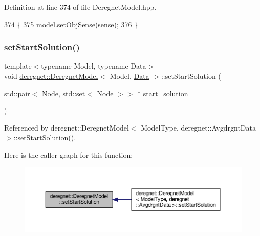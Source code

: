 Definition at line 374 of file Deregnet\+Model.\+hpp.


\begin{DoxyCode}
374                                                                     \{
375     \hyperlink{classderegnet_1_1DeregnetModel_a30d525de2086e342b33fe3e45ede4947}{model}.setObjSense(sense);
376 \}
\end{DoxyCode}
\mbox{\label{classderegnet_1_1DeregnetModel_a7a76da5bb39123d94c57ba2c940cb1c2}} 
\subsubsection{\texorpdfstring{set\+Start\+Solution()}{setStartSolution()}\hspace{0.1cm}{\footnotesize\ttfamily [1/3]}}
{\footnotesize\ttfamily template$<$typename Model, typename Data$>$ \\
void \hyperlink{classderegnet_1_1DeregnetModel}{deregnet\+::\+Deregnet\+Model}$<$ Model, \hyperlink{avgdrgnt_8cpp_a1d1235306db276e9b36acba1db1509e8}{Data} $>$\+::set\+Start\+Solution (\begin{DoxyParamCaption}\item[{std\+::pair$<$ \hyperlink{namespacederegnet_a744bad34f2de9856d36715a445f027f3}{Node}, std\+::set$<$ \hyperlink{namespacederegnet_a744bad34f2de9856d36715a445f027f3}{Node} $>$$>$ $\ast$}]{start\+\_\+solution }\end{DoxyParamCaption})\hspace{0.3cm}{\ttfamily [private]}}



Referenced by deregnet\+::\+Deregnet\+Model$<$ Model\+Type, deregnet\+::\+Avgdrgnt\+Data $>$\+::set\+Start\+Solution().

Here is the caller graph for this function\+:\nopagebreak
\begin{figure}[H]
\begin{center}
\leavevmode
\includegraphics[width=350pt]{classderegnet_1_1DeregnetModel_a7a76da5bb39123d94c57ba2c940cb1c2_icgraph}
\end{center}
\end{figure}
\mbox{\label{classderegnet_1_1DeregnetModel_afc649e6b52c4e993b17bad158799fdb3}} 
